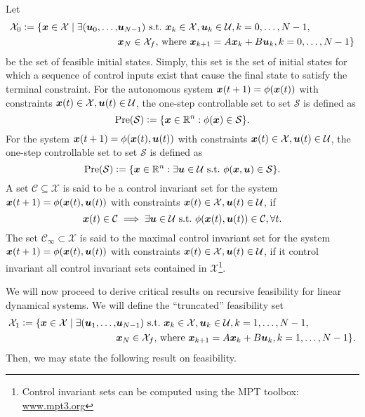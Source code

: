 Let 
\begin{align}
    \mathcal{X}_0 \vcentcolon= \{\bm{x} \in \mathcal{X} \mid \exists (\bm{u}_0, \ldots,& \bm{u}_{N-1}) \,\,\text{s.t.}\,\, \bm{x}_k \in \mathcal{X}, \bm{u}_k \in \mathcal{U}, k=0,\ldots,N-1,\\
    & \bm{x}_N \in \mathcal{X}_f, \,\text{where}\,\, \bm{x}_{k+1} = A \bm{x}_k + B \bm{u}_k, k = 0, \ldots, N-1 \nonumber
    \}
\end{align}
be the set of feasible initial states. Simply, this set is the set of initial states for which a sequence of control inputs exist that cause the final state to satisfy the terminal constraint. For the autonomous system $\bm{x}(t+1) = \phi(\bm{x}(t))$ with constraints $\bm{x}(t) \in \mathcal{X}, \bm{u}(t) \in \mathcal{U}$, the one-step controllable set to set $\mathcal{S}$ is defined as 
\begin{equation}
    \text{Pre}(\mathcal{S}) \vcentcolon= \{\bm{x} \in \mathbb{R}^n : \phi(\bm{x})\in \mathcal{S}\}.
\end{equation}
For the system $\bm{x}(t+1) = \phi(\bm{x}(t),\bm{u}(t))$ with constraints $\bm{x}(t) \in \mathcal{X}, \bm{u}(t) \in \mathcal{U}$, the one-step controllable set to set $\mathcal{S}$ is defined as 
\begin{equation}
    \text{Pre}(\mathcal{S}) \vcentcolon= \{\bm{x} \in \mathbb{R}^n : \exists \bm{u} \in \mathcal{U} \,\,\text{s.t.}\,\, \phi(\bm{x},\bm{u})\in \mathcal{S}\}.
\end{equation}
A set $\mathcal{C} \subseteq \mathcal{X}$ is said to be a control invariant set for the system $\bm{x}(t+1) = \phi(\bm{x}(t),\bm{u}(t))$ with constraints $\bm{x}(t) \in \mathcal{X}, \bm{u}(t) \in \mathcal{U}$, if
\begin{equation}
    \bm{x}(t) \in \mathcal{C} \implies \exists \bm{u} \in \mathcal{U} \,\,\text{s.t.}\,\, \phi(\bm{x}(t),\bm{u}(t)) \in \mathcal{C}, \forall t.
\end{equation}
The set $\mathcal{C}_\infty \subset \mathcal{X}$ is said to the maximal control invariant set for the system $\bm{x}(t+1) = \phi(\bm{x}(t),\bm{u}(t))$ with constraints $\bm{x}(t) \in \mathcal{X}, \bm{u}(t) \in \mathcal{U}$, if it control invariant all control invariant sets contained in $\mathcal{X}$\footnote{Control invariant sets can be computed using the MPT toolbox: \url{www.mpt3.org}}. 

We will now proceed to derive critical results on recursive feasibility for linear dynamical systems. We will define the ``truncated'' feasibility set 
\begin{align}
    \mathcal{X}_1 \vcentcolon= \{\bm{x} \in \mathcal{X} \mid \exists (\bm{u}_1, \ldots,& \bm{u}_{N-1}) \,\,\text{s.t.}\,\, \bm{x}_k \in \mathcal{X}, \bm{u}_k \in \mathcal{U}, k=1,\ldots,N-1,\\
    & \bm{x}_N \in \mathcal{X}_f, \,\text{where}\,\, \bm{x}_{k+1} = A \bm{x}_k + B \bm{u}_k, k = 1, \ldots, N-1 \nonumber
    \}.
\end{align}
Then, we may state the following result on feasibility. 

